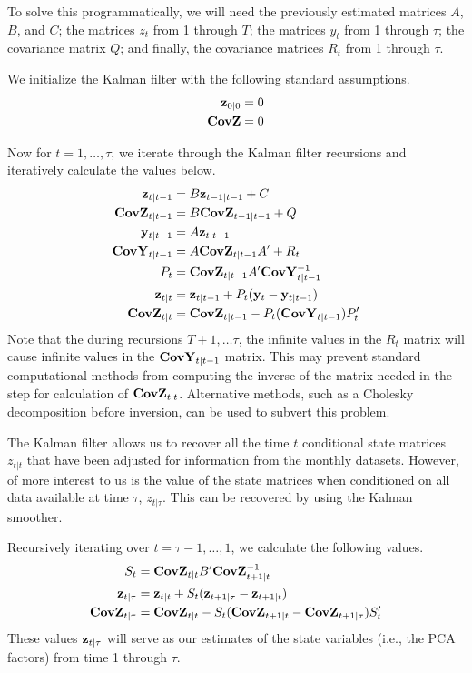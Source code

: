 \documentclass[11pt, letterpaper]{article}
\newcommand{\vv}[1]{\textcolor{black}{\mathbf{#1}}}
\begin{document}
To solve this programmatically, we will need the previously estimated matrices $A$, $B$, and $C$; the matrices $z_t$ from 1 through $T$; the matrices $y_t$ from 1 through $\tau$; the covariance matrix $Q$; and finally, the covariance matrices $R_t$ from 1 through $\tau$.

We initialize the Kalman filter with the following standard assumptions. 
\begin{align*}
	\vv{z}_{0|0} = 0\\
	\vv{CovZ} = 0
\end{align*}

Now for $t = 1, \dots, \tau$, we iterate through the Kalman filter recursions and iteratively calculate the values below.
\begin{align*}
	\vv{z}_{t|t-1} &= B \vv{z}_{t-1|t-1} + C\\
	\vv{CovZ}_{t|t-1} &= B \vv{CovZ}_{t-1|t-1} + Q\\
	\vv{y}_{t|t-1} &= A \vv{z}_{t|t-1}\\
	\vv{CovY}_{t|t-1} &= A \vv{CovZ}_{t|t-1} A' + R_t\\
	P_t &= \vv{CovZ}_{t|t-1} A' \vv{CovY}^{-1}_{t|t-1}\\
	\vv{z}_{t|t} &= \vv{z}_{t|t-1} + P_t (\vv{y}_t - \vv{y}_{t|t-1})\\
	\vv{CovZ}_{t|t} &= \vv{CovZ}_{t|t-1} - P_t (\vv{CovY}_{t|t-1}) P'_t
\end{align*}
Note that the during recursions $T + 1, \dots \tau$, the infinite values in the $R_t$ matrix will cause infinite values in the $\vv{CovY}_{t|t-1}$ matrix. This may prevent standard computational methods from computing the inverse of the matrix needed in the step for calculation of $\vv{CovZ}_{t|t}$. Alternative methods, such as a Cholesky decomposition before inversion, can be used to subvert this problem.

The Kalman filter allows us to recover all the time $t$ conditional state matrices $z_{t|t}$ that have been adjusted for information from the monthly datasets. However, of more interest to us is the value of the state matrices when conditioned on all data available at time $\tau$, $z_{t|\tau}$. This can be recovered by using the Kalman smoother.

Recursively iterating over $t = \tau - 1, \dots, 1$, we calculate the following values. 
\begin{align*}
	S_{t} &= \vv{CovZ}_{t|t} B' \vv{CovZ}^{-1}_{t + 1|t}\\
	\vv{z}_{t|\tau} &= \vv{z}_{t|t} + S_t (\vv{z}_{t+1|\tau} - \vv{z}_{t + 1|t})\\
	\vv{CovZ}_{t|\tau} &= \vv{CovZ}_{t|t} - S_t(\vv{CovZ}_{t + 1|t} - \vv{CovZ}_{t + 1|\tau})S'_t
\end{align*}
These values $\vv{z}_{t|\tau}$ will serve as our estimates of the state variables (i.e., the PCA factors) from time 1 through $\tau$.
\end{document}
